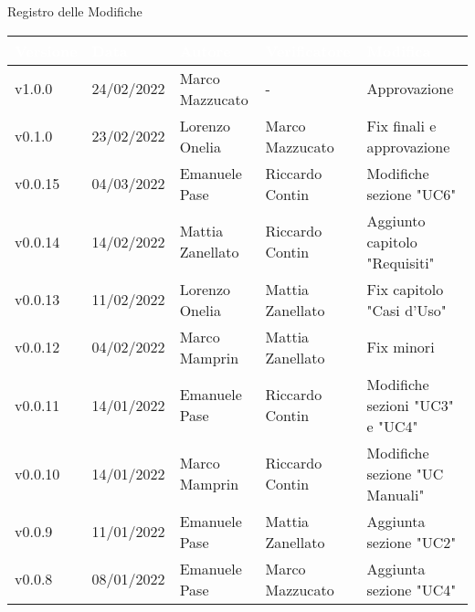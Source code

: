 \begin{center}
  \huge{Registro delle Modifiche}
\end{center}

\renewcommand\arraystretch{1,5}
{\centering
\begin{longtable}{|C{1.8cm}|C{2.1cm}|C{2cm}|C{2.4cm}|L{4.4cm}|}
  \hline
  \textcolor[HTML]{FFFFFF}{\textbf{Versione}} & \textcolor[HTML]{FFFFFF}{\textbf{Data}} & \textcolor[HTML]{FFFFFF}{\textbf{Autore}}  & \textcolor[HTML]{FFFFFF}{\textbf{Verificatore}} & \textcolor[HTML]{FFFFFF}{\textbf{Modifica}}    \\ \hline
  v1.0.0           & 24/02/2022   & Marco Mazzucato & - & Approvazione     \\ \hline
  v0.1.0           & 23/02/2022    & Lorenzo Onelia & Marco Mazzucato        & Fix finali e approvazione                        \\ \hline
  v0.0.15          & 04/03/2022    & Emanuele Pase  & Riccardo Contin         & Modifiche sezione "UC6"                        \\ \hline
  v0.0.14           & 14/02/2022    & Mattia Zanellato  & Riccardo Contin     & Aggiunto capitolo "Requisiti"                   \\ \hline
  v0.0.13           & 11/02/2022    & Lorenzo Onelia    & Mattia Zanellato    & Fix capitolo "Casi d'Uso"                       \\ \hline
  v0.0.12           & 04/02/2022    & Marco Mamprin     & Mattia Zanellato    & Fix minori                                      \\ \hline
  v0.0.11           & 14/01/2022    & Emanuele Pase     & Riccardo Contin     & Modifiche sezioni "UC3" e "UC4"                 \\ \hline
  v0.0.10           & 14/01/2022    & Marco Mamprin     & Riccardo Contin     & Modifiche sezione "UC Manuali"                  \\ \hline
  v0.0.9            & 11/01/2022    & Emanuele Pase     & Mattia Zanellato    & Aggiunta sezione "UC2"                          \\ \hline
  v0.0.8            & 08/01/2022    & Emanuele Pase     & Marco Mazzucato     & Aggiunta sezione "UC4"                          \\ \hline

\end{longtable}}
